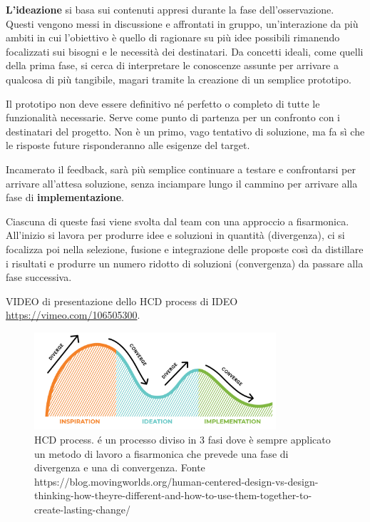 \textbf{L'ideazione} si basa sui contenuti appresi durante la fase dell'osservazione. Questi vengono messi in discussione e affrontati in gruppo, un'interazione da più ambiti in cui l'obiettivo è quello di ragionare su più idee possibili rimanendo focalizzati sui bisogni e le necessità dei destinatari. Da concetti ideali, come quelli della prima fase, si cerca di interpretare le conoscenze assunte per arrivare a qualcosa di più tangibile, magari tramite la creazione di un semplice prototipo. 

Il prototipo non deve essere definitivo né perfetto o completo di tutte le funzionalità necessarie. Serve come punto di partenza per un confronto con i destinatari del progetto. Non è un primo, vago tentativo di soluzione, ma fa sì che le risposte future risponderanno alle esigenze del target.

Incamerato il feedback, sarà più semplice continuare a testare e confrontarsi per arrivare all'attesa soluzione, senza inciampare lungo il cammino per arrivare alla fase di \textbf{implementazione}.

Ciascuna di queste fasi viene svolta dal team con una approccio a fisarmonica. All'inizio si lavora per produrre idee e soluzioni in quantità (divergenza), ci si focalizza poi nella selezione, fusione e integrazione delle proposte così da distillare i risultati e produrre un numero ridotto di soluzioni (convergenza) da passare alla fase successiva.

VIDEO di presentazione dello HCD process di IDEO \url{https://vimeo.com/106505300}.

\begin{figure}[!h]
	\centering
	\includegraphics[width=0.8\textwidth]{immagini/HCD-process.png}
	\caption{HCD process. é un processo diviso in 3 fasi dove è sempre applicato un metodo di lavoro a fisarmonica che prevede una fase di divergenza e una di convergenza. Fonte https://blog.movingworlds.org/human-centered-design-vs-design-thinking-how-theyre-different-and-how-to-use-them-together-to-create-lasting-change/} 
	\label{hcd-process}
\end{figure}

